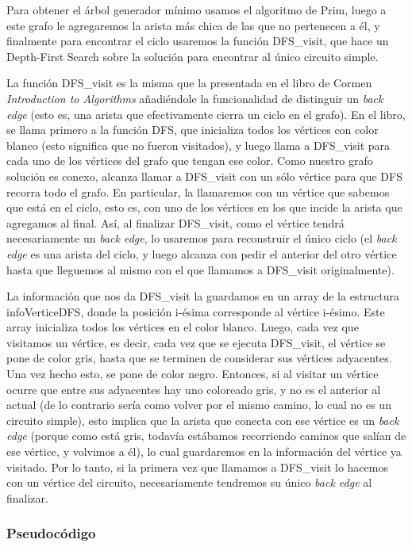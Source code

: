 Para obtener el árbol generador mínimo usamos el algoritmo de Prim, luego a este grafo le agregaremos la arista más chica de las que no pertenecen a él, y finalmente para encontrar el ciclo usaremos la función DFS\_visit, que hace un Depth-First Search sobre la solución para encontrar al único circuito simple.

La función DFS\_visit es la misma que la presentada en el libro de Cormen \emph{Introduction to Algorithms}\cite[p.~604]{cormen} añadiéndole la funcionalidad de distinguir un \emph{back edge} (esto es, una arista que efectivamente cierra un ciclo en el grafo). En el libro, se llama primero a la función DFS, que inicializa todos los vértices con color blanco (esto significa que no fueron visitados), y luego llama a DFS\_visit para cada uno de los vértices del grafo que tengan ese color. Como nuestro grafo solución es conexo, alcanza llamar a DFS\_visit con un sólo vértice para que DFS recorra todo el grafo. En particular, la llamaremos con un vértice que sabemos que está en el ciclo, esto es, con uno de los vértices en los que incide la arista que agregamos al final. Así, al finalizar DFS\_visit, como el vértice tendrá necesariamente un \emph{back edge}, lo usaremos para reconstruir el único ciclo (el \emph{back edge} es una arista del ciclo, y luego alcanza con pedir el anterior del otro vértice hasta que lleguemos al mismo con el que llamamos a DFS\_visit originalmente). 

La información que nos da DFS\_visit la guardamos en un array de la estructura infoVerticeDFS, donde la posición i-ésima corresponde al vértice i-ésimo. Este array inicializa todos los vértices en el color blanco. Luego, cada vez que visitamos un vértice, es decir, cada vez que se ejecuta DFS\_visit, el vértice se pone de color gris, hasta que se terminen de considerar sus vértices adyacentes. Una vez hecho esto, se pone de color negro. Entonces, si al visitar un vértice ocurre que entre sus adyacentes hay uno coloreado gris, y no es el anterior al actual (de lo contrario sería como volver por el mismo camino, lo cual no es un circuito simple), esto implica que la arista que conecta con ese vértice es un \emph{back edge} (porque como está gris, todavía estábamos recorriendo caminos que salían de ese vértice, y volvimos a él), lo cual guardaremos en la información del vértice ya visitado. Por lo tanto, si la primera vez que llamamos a DFS\_visit lo hacemos con un vértice del circuito, necesariamente tendremos su único \emph{back edge} al finalizar.

\subsubsection{Pseudocódigo}

